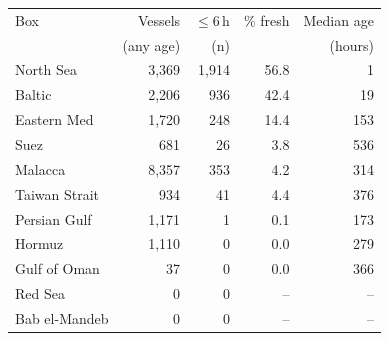 \begin{tabular}{@{}lrrrr@{}}\toprule
Box & Vessels & $\le$6\,h & \% fresh & Median age\\
 & (any age) & (n) & & (hours)\\\midrule
North Sea & 3,369 & 1,914 & 56.8 & 1\\
Baltic & 2,206 & 936 & 42.4 & 19\\
Eastern Med & 1,720 & 248 & 14.4 & 153\\
Suez & 681 & 26 & 3.8 & 536\\
Malacca & 8,357 & 353 & 4.2 & 314\\
Taiwan Strait & 934 & 41 & 4.4 & 376\\
Persian Gulf & 1,171 & 1 & 0.1 & 173\\
Hormuz & 1,110 & 0 & 0.0 & 279\\
Gulf of Oman & 37 & 0 & 0.0 & 366\\
Red Sea & 0 & 0 & -- & --\\
Bab el-Mandeb & 0 & 0 & -- & --\\
\bottomrule\end{tabular}